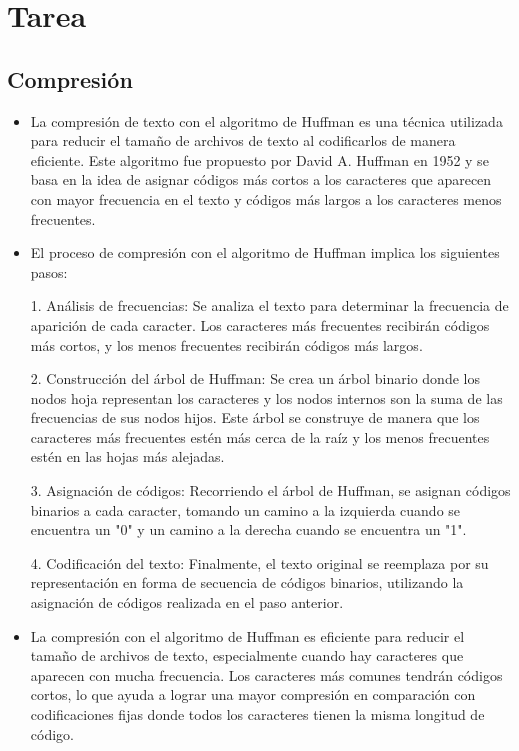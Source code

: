 \documentclass{article}
\begin{document}
	\section{Tarea}
	\subsection{Compresión}
	\begin{itemize}
		
		\item La compresión de texto con el algoritmo de Huffman es una técnica utilizada para reducir el tamaño de archivos de texto al codificarlos de manera eficiente. Este algoritmo fue propuesto por David A. Huffman en 1952 y se basa en la idea de asignar códigos más cortos a los caracteres que aparecen con mayor frecuencia en el texto y códigos más largos a los caracteres menos frecuentes.

		\item El proceso de compresión con el algoritmo de Huffman implica los siguientes pasos:
		
		1. Análisis de frecuencias: Se analiza el texto para determinar la frecuencia de aparición de cada caracter. Los caracteres más frecuentes recibirán códigos más cortos, y los menos frecuentes recibirán códigos más largos.
		
		2. Construcción del árbol de Huffman: Se crea un árbol binario donde los nodos hoja representan los caracteres y los nodos internos son la suma de las frecuencias de sus nodos hijos. Este árbol se construye de manera que los caracteres más frecuentes estén más cerca de la raíz y los menos frecuentes estén en las hojas más alejadas.
		
		3. Asignación de códigos: Recorriendo el árbol de Huffman, se asignan códigos binarios a cada caracter, tomando un camino a la izquierda cuando se encuentra un "0" y un camino a la derecha cuando se encuentra un "1".
		
		4. Codificación del texto: Finalmente, el texto original se reemplaza por su representación en forma de secuencia de códigos binarios, utilizando la asignación de códigos realizada en el paso anterior.
		
		\item La compresión con el algoritmo de Huffman es eficiente para reducir el tamaño de archivos de texto, especialmente cuando hay caracteres que aparecen con mucha frecuencia.
		 Los caracteres más comunes tendrán códigos cortos, lo que ayuda a lograr una mayor compresión en comparación con codificaciones fijas donde todos los caracteres tienen la misma longitud de código.
		

\end{itemize}
\end{document}
